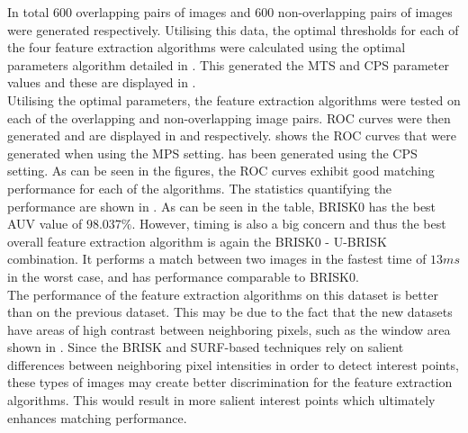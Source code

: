 \documentclass{article}
\begin{document}
In total $600$ overlapping pairs of images and $600$ non-overlapping pairs of images were generated respectively. Utilising this data, the optimal thresholds for each of the four feature extraction algorithms were calculated using the optimal parameters algorithm detailed in . This generated the MTS and CPS parameter values and these are displayed in .\\

Utilising the optimal parameters, the feature extraction algorithms were tested on each of the overlapping and non-overlapping image pairs. ROC curves were then generated and are displayed in  and  respectively.  shows the ROC curves that were generated when using the MPS setting.  has been generated using the CPS setting. As can be seen in the figures, the ROC curves exhibit good matching performance for each of the algorithms. The statistics quantifying the performance are shown in . As can be seen in the table, BRISK0 has the best AUV value of $98.037\%$. However, timing is also a big concern and thus the best overall feature extraction algorithm is again the BRISK0 - U-BRISK combination. It performs a match between two images in the fastest time of $13 ms$ in the worst case, and has performance comparable to BRISK0.\\

The performance of the feature extraction algorithms on this dataset is better than on the previous dataset. This may be due to the fact that the new datasets have areas of high contrast between neighboring pixels, such as the window area shown in . Since the BRISK and SURF-based techniques rely on salient differences between neighboring pixel intensities in order to detect interest points, these types of images may create better discrimination for the feature extraction algorithms. This would result in more salient interest points which ultimately enhances matching performance.\\

\end{document}
